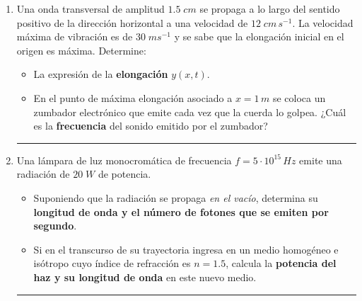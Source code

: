 \documentclass[a4paper,12pt]{exam}
\newcommand{\halmos}{\vspace*{-7mm}
	
					\begin{flushright}
						\rule{1mm}{2.5mm} 
					\end{flushright}\vspace*{-6mm}
						
					  }
\renewcommand{\qed}{\halmos}
\begin{document}
\newpage
{}

\vspace*{.1cm}


\begin{enumerate}


	\item Una onda transversal de amplitud $1.5\;cm$ se propaga a lo largo del sentido positivo de la dirección horizontal a una velocidad de $12\;cm\,s^{-1}$. La velocidad máxima de vibración es de $30\;m s^{-1}$ y se sabe que la elongación inicial en el origen es máxima. Determine:
	\begin{itemize}
		\item[a)]  La expresión de la \textbf{elongación} $y(x,t)$.
		\item[b)]  En el punto de máxima elongación asociado a $x=1\,m$ se coloca un zumbador electrónico que emite cada vez que la cuerda lo golpea. ¿Cuál es la \textbf{frecuencia} del sonido emitido por el zumbador?
	\end{itemize}
	\qed
			

	\item 	Una lámpara de luz monocromática de frecuencia $f=5\cdot 10^{15}\,Hz$ emite una radiación de $20\;W$ de potencia. 
			\begin{itemize}
				\item[a)] Suponiendo que la radiación se propaga \textit{en el vacío}, determina su \textbf{longitud de onda y el número de fotones que se emiten por segundo}.
				\item[b)] Si en el transcurso de su trayectoria ingresa en un medio homogéneo e isótropo cuyo índice de refracción es $n=1.5$, calcula la \textbf{potencia del haz y su longitud de onda} en este nuevo medio.
			\end{itemize}
			\qed




\end{enumerate}
\end{document}
